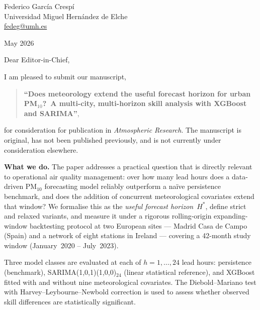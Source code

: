 \documentclass[12pt,a4paper]{article}
\begin{document}

\noindent
Federico García Crespí\\
Universidad Miguel Hernández de Elche\\
\href{mailto:fedeg@umh.es}{fedeg@umh.es}

\bigskip
{} May 2026

\bigskip


\noindent
Dear Editor-in-Chief,  %

\bigskip


I am pleased to submit our manuscript,

\begin{quote}
\textbf{``Does meteorology extend the useful forecast horizon for urban
PM$_{10}$?\
A multi-city, multi-horizon skill analysis with XGBoost and SARIMA''},
\end{quote}

for consideration for publication in
\textit{Atmospheric Research}.
The manuscript is original, has not been published previously, and is not
currently under consideration elsewhere.


\textbf{What we do.}
The paper addresses a practical question that is directly relevant to
operational air quality management: over how many lead hours does a
data-driven PM$_{10}$ forecasting model reliably outperform a naïve persistence
benchmark, and does the addition of concurrent meteorological covariates extend
that window?  We formalise this as the \emph{useful forecast horizon}~$H^*$,
define strict and relaxed variants, and measure it under a rigorous
rolling-origin expanding-window backtesting protocol at two European sites ---
Madrid Casa de Campo (Spain) and a network of eight stations in Ireland ---
covering a 42-month study window (January~2020 -- July~2023).

Three model classes are evaluated at each of $h = 1, \ldots, 24$ lead hours:
persistence (benchmark), SARIMA(1,0,1)(1,0,0)$_{24}$ (linear statistical
reference), and XGBoost fitted with and without nine meteorological covariates.
The Diebold--Mariano test with Harvey--Leybourne--Newbold correction is used
to assess whether observed skill differences are statistically significant.
\end{document}
